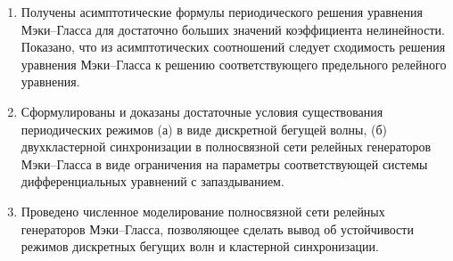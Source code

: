 
\begin{enumerate}
  \item Получены асимптотические формулы периодического решения уравнения Мэки--Гласса для достаточно больших значений коэффициента нелинейности. Показано, что из асимптотических соотношений следует сходимость решения уравнения Мэки--Гласса к решению соответствующего предельного релейного уравнения.
  \item Сформулированы и доказаны достаточные условия существования периодических режимов (а) в виде дискретной бегущей волны, (б) двухкластерной синхронизации в полносвязной сети релейных генераторов Мэки--Гласса в виде ограничения на параметры соответствующей системы дифференциальных уравнений с запаздыванием. 
  \item Проведено численное моделирование полносвязной сети релейных генераторов Мэки--Гласса, позволяющее сделать вывод об устойчивости режимов дискретных бегущих волн и кластерной синхронизации.
\end{enumerate}
